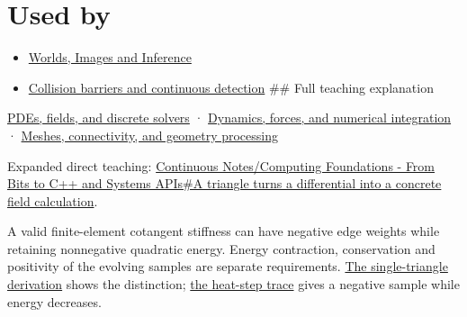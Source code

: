\section{Used by}\label{appendix-1988d465c119-used-by}

\begin{itemize}
\item
  \href{Continuous\%20Notes/University\%20-\%20Worlds,\%20Images\%20and\%20Inference\%20-\%20Graphics,\%20Vision\%20and\%20Photography}{Worlds, Images and Inference}
\item
  \hyperref[appendix-a9ba01fa72a6]{Collision barriers and continuous detection} \#\# Full teaching explanation
\end{itemize}

\href{Continuous\%20Notes/University\%20-\%20Worlds,\%20Images\%20and\%20Inference\%20-\%20Graphics,\%20Vision\%20and\%20Photography\#PDEs,\%20fields,\%20and\%20discrete\%20solvers}{PDEs, fields, and discrete solvers} · \href{Continuous\%20Notes/University\%20-\%20Worlds,\%20Images\%20and\%20Inference\%20-\%20Graphics,\%20Vision\%20and\%20Photography\#Dynamics,\%20forces,\%20and\%20numerical\%20integration}{Dynamics, forces, and numerical integration} · \href{Continuous\%20Notes/University\%20-\%20Worlds,\%20Images\%20and\%20Inference\%20-\%20Graphics,\%20Vision\%20and\%20Photography\#Meshes,\%20connectivity,\%20and\%20geometry\%20processing}{Meshes, connectivity, and geometry processing}

Expanded direct teaching: \href{Continuous\%20Notes/Computing\%20Foundations\%20-\%20From\%20Bits\%20to\%20C++\%20and\%20Systems\%20APIs\#A\%20triangle\%20turns\%20a\%20differential\%20into\%20a\%20concrete\%20field\%20calculation}{Continuous Notes/Computing Foundations - From Bits to C++ and Systems APIs\#A triangle turns a differential into a concrete field calculation}.

A valid finite-element cotangent stiffness can have negative edge weights while retaining nonnegative quadratic energy. Energy contraction, conservation and positivity of the evolving samples are separate requirements. \href{Continuous\%20Notes/University\%20-\%20Worlds,\%20Images\%20and\%20Inference\%20-\%20Graphics,\%20Vision\%20and\%20Photography\#Nonnegative\%20energy\%20and\%20nonnegative\%20weights\%20are\%20different\%20promises}{The single-triangle derivation} shows the distinction; \href{Continuous\%20Notes/University\%20-\%20Worlds,\%20Images\%20and\%20Inference\%20-\%20Graphics,\%20Vision\%20and\%20Photography\#A\%20stable\%20heat\%20step\%20can\%20still\%20create\%20a\%20negative\%20sample}{the heat-step trace} gives a negative sample while energy decreases.
